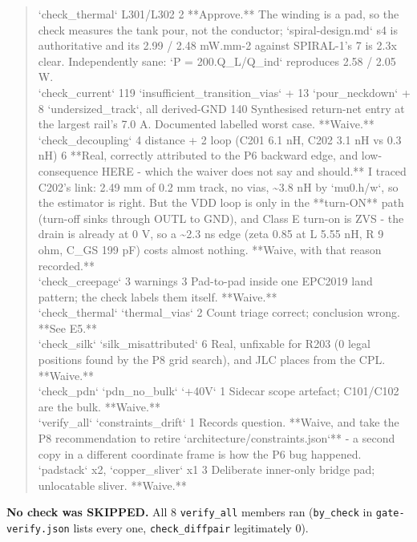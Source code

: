 \documentclass[11pt,a4paper]{article}
\begin{document}
\begin{quote}
\textbar{} `check\_thermal` L301/L302 \textbar{} 2 \textbar{} {*}{*}Approve.{*}{*} The winding is a pad, so the check measures the tank pour, not the conductor; `spiral-design.md` s4 is authoritative and its 2.99 / 2.48 mW.mm-2 against SPIRAL-1's 7 is 2.3x clear. Independently sane: `P = 200.Q\_L/Q\_ind` reproduces 2.58 / 2.05 W. \textbar{}\\
\textbar{} `check\_current` 119 `insufficient\_transition\_vias` + 13 `pour\_neckdown` + 8 `undersized\_track`, all derived-GND \textbar{} 140 \textbar{} Synthesised return-net entry at the largest rail's 7.0 A. Documented labelled worst case. {*}{*}Waive.{*}{*} \textbar{}\\
\textbar{} `check\_decoupling` 4 distance + 2 loop (C201 6.1 nH, C202 3.1 nH vs 0.3 nH) \textbar{} 6 \textbar{} {*}{*}Real, correctly attributed to the P6 backward edge, and low-consequence HERE - which the waiver does not say and should.{*}{*} I traced C202's link: 2.49 mm of 0.2 mm track, no vias, \textasciitilde{}3.8 nH by `mu0.h/w`, so the estimator is right. But the VDD loop is only in the {*}{*}turn-ON{*}{*} path (turn-off sinks through OUTL to GND), and Class E turn-on is ZVS - the drain is already at 0 V, so a \textasciitilde{}2.3 ns edge (zeta 0.85 at L 5.55 nH, R 9 ohm, C\_GS 199 pF) costs almost nothing. {*}{*}Waive, with that reason recorded.{*}{*} \textbar{}\\
\textbar{} `check\_creepage` 3 warnings \textbar{} 3 \textbar{} Pad-to-pad inside one EPC2019 land pattern; the check labels them itself. {*}{*}Waive.{*}{*} \textbar{}\\
\textbar{} `check\_thermal` `thermal\_vias` \textbar{} 2 \textbar{} Count triage correct; conclusion wrong. {*}{*}See E5.{*}{*} \textbar{}\\
\textbar{} `check\_silk` `silk\_misattributed` \textbar{} 6 \textbar{} Real, unfixable for R203 (0 legal positions found by the P8 grid search), and JLC places from the CPL. {*}{*}Waive.{*}{*} \textbar{}\\
\textbar{} `check\_pdn` `pdn\_no\_bulk` `+40V` \textbar{} 1 \textbar{} Sidecar scope artefact; C101/C102 are the bulk. {*}{*}Waive.{*}{*} \textbar{}\\
\textbar{} `verify\_all` `constraints\_drift` \textbar{} 1 \textbar{} Records question. {*}{*}Waive, and take the P8 recommendation to retire `architecture/constraints.json`{*}{*} - a second copy in a different coordinate frame is how the P6 bug happened. \textbar{}\\
\textbar{} `padstack` x2, `copper\_sliver` x1 \textbar{} 3 \textbar{} Deliberate inner-only bridge pad; unlocatable sliver. {*}{*}Waive.{*}{*} \textbar{}
\end{quote}
\textbf{No check was SKIPPED.} All 8 \texttt{verify\_all} members ran (\texttt{by\_check} in \texttt{gate-verify.json} lists every one, \texttt{check\_diffpair} legitimately 0).
\end{document}
